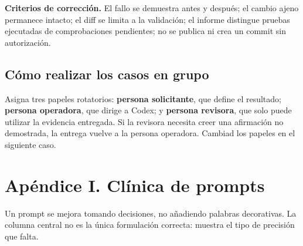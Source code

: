 \documentclass[10pt,a4paper,openany]{book}
\begin{document}
\begin{successbox}

\textbf{Criterios de corrección.} El fallo se demuestra antes y después;
el cambio ajeno permanece intacto; el diff se limita a la validación; el
informe distingue pruebas ejecutadas de comprobaciones pendientes; no se
publica ni crea un commit sin autorización.

\end{successbox}

\section{Cómo realizar los casos en
grupo}\label{cuxf3mo-realizar-los-casos-en-grupo}

Asigna tres papeles rotatorios: \textbf{persona solicitante}, que define
el resultado; \textbf{persona operadora}, que dirige a Codex; y
\textbf{persona revisora}, que solo puede utilizar la evidencia
entregada. Si la revisora necesita creer una afirmación no demostrada,
la entrega vuelve a la persona operadora. Cambiad los papeles en el
siguiente caso.

\chapter{Apéndice I. Clínica de
prompts}\label{apuxe9ndice-i.-cluxednica-de-prompts}

Un prompt se mejora tomando decisiones, no añadiendo palabras
decorativas. La columna central no es la única formulación correcta:
muestra el tipo de precisión que falta.
\end{document}
